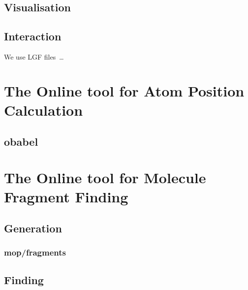 \subsection{Visualisation}
\nlipsum

\subsection{Interaction}
We use LGF files~\cite{dezso2011lemon}\ldots

\nlipsum


\section[OAPoC]{The Online tool for Atom Position Calculation}
\nlipsum

\subsection{obabel}
\nlipsum


\section[OMFraF]{The Online tool for Molecule Fragment Finding}
\nlipsum

\subsection{Generation}
\nlipsum

\subsubsection{mop/fragments}
\nlipsum

\subsection{Finding}
\nlipsum
